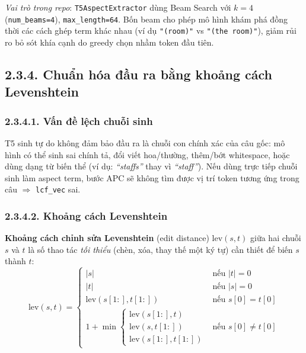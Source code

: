 \noindent\textit{Vai trò trong repo}: \texttt{T5AspectExtractor} dùng
Beam Search với $k=4$ (\texttt{num\_beams=4}), \texttt{max\_length=64}.
Bốn beam cho phép mô hình khám phá đồng thời các cách ghép term khác
nhau (ví dụ \texttt{"(room)"} vs \texttt{"(the room)"}), giảm rủi ro
bỏ sót khía cạnh do greedy chọn nhầm token đầu tiên.

\subsection{2.3.4.\; Chuẩn hóa đầu ra bằng khoảng cách Levenshtein}
\label{subsec:levenshtein}

\subsubsection{2.3.4.1.\; Vấn đề lệch chuỗi sinh}

T5 sinh tự do không đảm bảo đầu ra là chuỗi con chính xác của câu gốc:
mô hình có thể sinh sai chính tả, đổi viết hoa/thường, thêm/bớt
whitespace, hoặc dùng dạng từ biến thể (ví dụ: \textit{``staffs''}
thay vì \textit{``staff''}). Nếu dùng trực tiếp chuỗi sinh làm aspect
term, bước APC sẽ không tìm được vị trí token tương ứng trong câu
$\Rightarrow$ \texttt{lcf\_vec} sai.

\subsubsection{2.3.4.2.\; Khoảng cách Levenshtein}
\label{subsec:levenshtein_dist}

\textbf{Khoảng cách chỉnh sửa Levenshtein} (edit distance) $\text{lev}(s, t)$
giữa hai chuỗi $s$ và $t$ là số thao tác \emph{tối thiểu} (chèn, xóa,
thay thế một ký tự) cần thiết để biến $s$ thành $t$:
\begin{equation}
\text{lev}(s,t) =
\begin{cases}
|s| & \text{nếu } |t|=0 \\
|t| & \text{nếu } |s|=0 \\
\text{lev}(s[1:], t[1:]) & \text{nếu } s[0]=t[0] \\
1 + \min \left\{
\begin{array}{l}
\text{lev}(s[1:], t) \\
\text{lev}(s, t[1:]) \\
\text{lev}(s[1:], t[1:])
\end{array}
\right. & \text{nếu } s[0]\neq t[0]
\end{cases}
\label{eq:levenshtein}
\end{equation}

